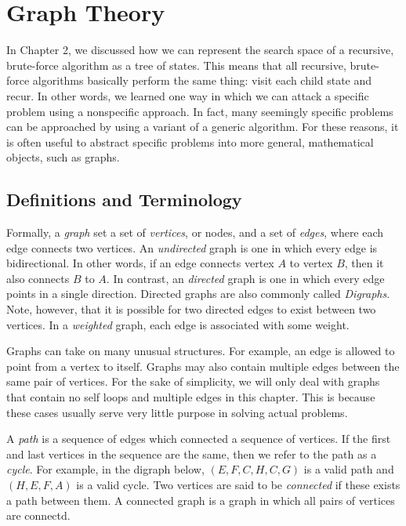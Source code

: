 \chapter{Graph Theory}

In Chapter 2, we discussed how we can represent the search space of a recursive, brute-force algorithm as a tree of states. This means that all recursive, brute-force algorithms basically perform the same thing: visit each child state and recur. In other words, we learned one way in which we can attack a specific problem using a nonspecific approach. In fact, many seemingly specific problems can be approached by using a variant of a generic algorithm. For these reasons, it is often useful to abstract specific problems into more general, mathematical objects, such as graphs. 


\section{Definitions and Terminology}

Formally, a \textit{graph} set a set of \textit{vertices}, or nodes, and a set of \textit{edges}, where each edge connects two vertices. An \textit{undirected} graph is one in which every edge is bidirectional. In other words, if an edge connects vertex $A$ to vertex $B$, then it also connects $B$ to $A$. In contrast, an \textit{directed} graph is one in which every edge points in a single direction. Directed graphs are also commonly called \textit{Digraphs}. Note, however, that it is possible for two directed edges to exist between two vertices. In a \textit{weighted} graph, each edge is associated with some weight. 

Graphs can take on many unusual structures. For example, an edge is allowed to point from a vertex to itself. Graphs may also contain multiple edges between the same pair of vertices. For the sake of simplicity, we will only deal with graphs that contain no self loops and multiple edges in this chapter. This is because these cases usually serve very little purpose in solving actual problems. 

A \textit{path} is a sequence of edges which connected a sequence of vertices.  If the first and last vertices in the sequence are the same, then we refer to the path as a \textit{cycle}. For example, in the digraph below, $(E, F, C, H, C, G)$ is a valid path and $(H, E, F, A)$ is a valid cycle. Two vertices are said to be \textit{connected} if these exists a path between them. A connected graph is a graph in which all pairs of vertices are connectd. 

